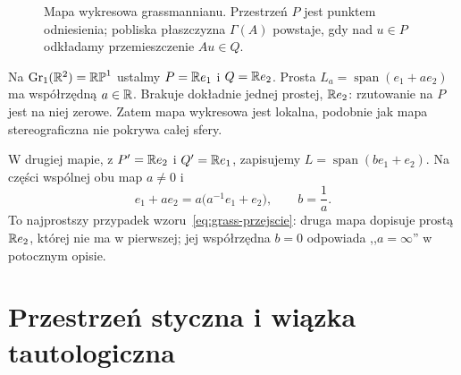 \begin{figure}[!htbp]
\centering
{}
\caption{Mapa wykresowa grassmannianu. Przestrzeń $P$ jest
punktem odniesienia; pobliska płaszczyzna $\Gamma(A)$ powstaje,
gdy nad $u\in P$ odkładamy przemieszczenie $Au\in Q$.}
\label{fig:grass-wykres}
\end{figure}

\begin{przyklad}
\label{prz:grass-rp1-mapy}
Na $\operatorname{Gr}_1(\mathbb{R}^2)=\mathbb{RP}^1$ ustalmy
$P=\mathbb{R} e_1$ i $Q=\mathbb{R} e_2$. Prosta
$L_a=\operatorname{span}(e_1+ae_2)$ ma współrzędną
$a\in\mathbb{R}$. Brakuje dokładnie jednej prostej, $\mathbb{R} e_2$:
rzutowanie na $P$ jest na niej zerowe. Zatem mapa
wykresowa jest lokalna, podobnie jak mapa stereograficzna
nie pokrywa całej sfery.

W drugiej mapie, z $P'=\mathbb{R} e_2$ i $Q'=\mathbb{R} e_1$,
zapisujemy $L=\operatorname{span}(be_1+e_2)$.
Na części wspólnej obu map $a\ne0$ i
\[
 e_1+ae_2=a\bigl(a^{-1}e_1+e_2\bigr),
 \qquad b=\frac1a.
\]
To najprostszy przypadek wzoru~\eqref{eq:grass-przejscie}:
druga mapa dopisuje prostą $\mathbb{R} e_2$, której nie ma
w pierwszej; jej współrzędna $b=0$ odpowiada
,,$a=\infty$'' w potocznym opisie.
\end{przyklad}

\section{Przestrzeń styczna i wiązka tautologiczna}
\label{sec:grass-styczna}

